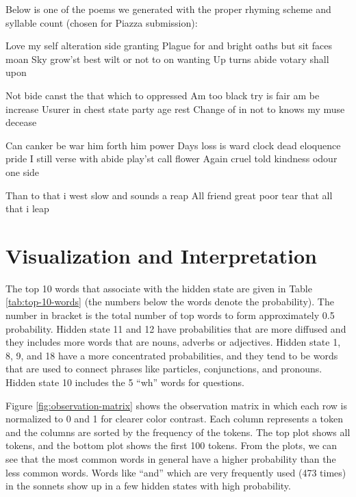 Below is one of the poems we generated with the proper rhyming scheme and syllable count (chosen for Piazza submission):

\begin{poem}
\begin{stanza}
Love my self alteration side granting \verseline
Plague for and bright oaths but sit faces moan \verseline
Sky grow'st best wilt or not to on wanting \verseline
Up turns abide votary shall upon
\end{stanza}
\begin{stanza}
Not bide canst the that which to oppressed \verseline
Am too black try is fair am be increase \verseline
Usurer in chest state party age rest \verseline
Change of in not to knows my muse decease 
\end{stanza}
\begin{stanza}
Can canker be war him forth him power \verseline
Days loss is ward clock dead eloquence pride \verseline
I still verse with abide play'st call flower \verseline
Again cruel told kindness odour one side  \end{stanza}
\begin{stanza}
Than to that i west slow and sounds a reap \verseline
All friend great poor tear that all that i leap \end{stanza}
\end{poem}

\section{Visualization and Interpretation}

The top 10 words that associate with the hidden state are given in Table \ref{tab:top-10-words} (the numbers below the words denote the probability). The number in bracket is the total number of top words to form approximately 0.5 probability. Hidden state 11 and 12 have probabilities that are more diffused and they includes more words that are nouns, adverbs or adjectives. Hidden state 1, 8, 9, and 18 have a more concentrated probabilities, and they tend to be words that are used to connect phrases like particles, conjunctions, and pronouns. Hidden state 10 includes the 5 ``wh'' words for questions. 

Figure \ref{fig:observation-matrix} shows the observation matrix in which each row is normalized to 0 and 1 for clearer color contrast. Each column represents a token and the columns are sorted by the frequency of the tokens. The top plot shows all tokens, and the bottom plot shows the first 100 tokens. From the plots, we can see that the most common words in general have a higher probability than the less common words. Words like ``and'' which are very frequently used (473 times) in the sonnets show up in a few hidden states with high probability.

